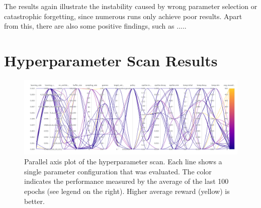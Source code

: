 \documentclass{article}
\begin{document}
The results again illustrate the instability caused by wrong parameter selection or catastrophic forgetting, 
since numerous runs only achieve poor results.
Apart from this, there are also some positive findings, such as .....

\nocite{DBLP:books/sp/Plaat22}





\appendix
\section{Hyperparameter Scan Results}
\label{sec_hyperparameter_scan_results}

\begin{figure}[h!]
   \centering
   \includegraphics[width=\textwidth]{assets/hyperparamter-scan/W&B Chart 3_30_2023, 2 24 25 PM.png}
   \caption{Parallel axis plot of the hyperparameter scan. 
      Each line shows a single parameter configuration that was evaluated. 
      The color indicates the performance measured by the average of the last 100 epochs (see legend on the right). 
      Higher average reward (yellow) is better.
   }
   \label{fig_hyperparameter_scan_parallel_axis}
\end{figure}
\end{document}
